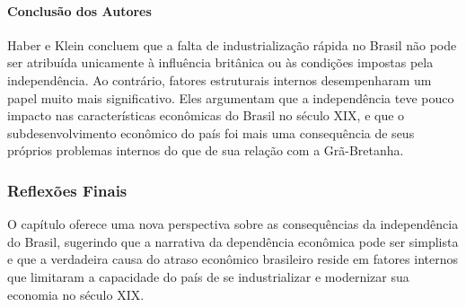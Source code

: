 \documentclass[a4paper,12pt]{article}[abntex2]
\begin{document}
\paragraph*{Conclusão dos Autores}
Haber e Klein concluem que a falta de industrialização rápida no Brasil não pode ser atribuída unicamente à influência britânica ou às condições impostas pela independência. Ao contrário, fatores estruturais internos desempenharam um papel muito mais significativo. Eles argumentam que a independência teve pouco impacto nas características econômicas do Brasil no século XIX, e que o subdesenvolvimento econômico do país foi mais uma consequência de seus próprios problemas internos do que de sua relação com a Grã-Bretanha.

\subsubsection*{Reflexões Finais}
O capítulo oferece uma nova perspectiva sobre as consequências da independência do Brasil, sugerindo que a narrativa da dependência econômica pode ser simplista e que a verdadeira causa do atraso econômico brasileiro reside em fatores internos que limitaram a capacidade do país de se industrializar e modernizar sua economia no século XIX.
\end{document}

